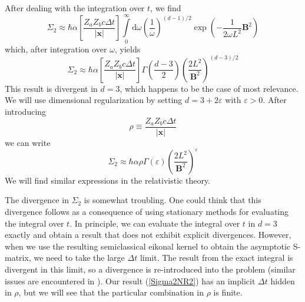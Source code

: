 After dealing with the integration over $t$, we find
\begin{equation}
	\Sigma_{2} \approx \hbar \alpha \left[ \frac{Z_{a} Z_{b} c \Delta t}{|\mathbf{x}|} \right] \int\limits_{0}^{\infty}\mathrm{d}\omega \left( \frac{1}{\omega} \right)^{(d - 1)/2} \exp{\left( - \frac{1}{2 \omega L^{2}} \mathbf{B}^{2} \right)}
\end{equation}
which, after integration over $\omega$, yields
\begin{equation}
	\Sigma_{2} \approx \hbar \alpha \left[ \frac{Z_{a} Z_{b} c \Delta t}{|\mathbf{x}|} \right] \Gamma\left( \frac{d - 3}{2} \right) \left( \frac{2 L^{2}}{\mathbf{B}^{2}} \right)^{(d - 3) / 2}
\end{equation}
This result is divergent in $d = 3$, which happens to be the case of most relevance. We will use dimensional regularization by setting $d = 3 + 2 \varepsilon$ with $\varepsilon > 0$. After introducing
\begin{equation}
	\rho \equiv \frac{Z_{a} Z_{b} c \Delta t}{|\mathbf{x}|}
\end{equation}
we can write
\begin{equation}
	\Sigma_{2} \approx \hbar \alpha \rho \Gamma(\varepsilon) \left( \frac{2 L^{2}}{\mathbf{B}^{2}} \right)^{\varepsilon} \label{Sigma2NR2}
\end{equation}
We will find similar expressions in the relativistic theory.

The divergence in $\Sigma_{2}$ is somewhat troubling. One could think that this divergence follows as a consequence of using stationary methods for evaluating the integral over $t$. In principle, we can evaluate the integral over $t$ in $d = 3$ exactly and obtain a result that does not exhibit explicit divergences. However, when we use the resulting semiclassical eikonal kernel to obtain the asymptotic S-matrix, we need to take the large $\Delta t$ limit. The result from the exact integral is divergent in this limit, so a divergence is re-introduced into the problem (similar issues are encountered in \cite{ZinnJustin}). Our result (\ref{Sigma2NR2}) has an implicit $\Delta t$ hidden in $\rho$, but we will see that the particular combination in $\rho$ is finite.
